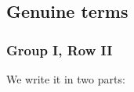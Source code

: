 \documentclass[9pt]{article}
\numberwithin{equation}{section}
\begin{document}
\subsection{Genuine terms}
\subsubsection{Group I, Row II}
We write it in two parts:
\end{document}
